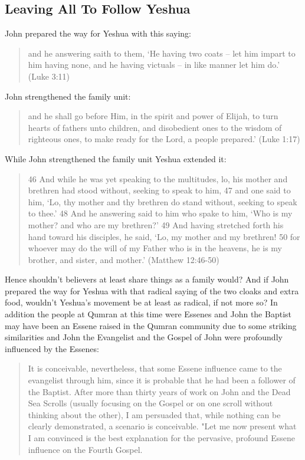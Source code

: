 \documentclass[11pt]{article}
\begin{document}
\subsection{Leaving All To Follow Yeshua} \label{leaving all to follow yeshua}
John prepared the way for Yeshua with this saying:
\begin{quote}
and he answering saith to them, `He having two coats -- let him impart to him having none, and he having victuals -- in like manner let him do.' (Luke 3:11) 
\end{quote}
John strengthened the family unit: 
\begin{quote}
and he shall go before Him, in the spirit and power of Elijah, to turn hearts of fathers unto children, and disobedient ones to the wisdom of righteous ones, to make ready for the Lord, a people prepared.' (Luke 1:17)
\end{quote}
While John strengthened the family unit Yeshua extended it: 
\begin{quote}
46 And while he was yet speaking to the multitudes, lo, his mother and brethren had stood without, seeking to speak to him, 47 and one said to him, `Lo, thy mother and thy brethren do stand without, seeking to speak to thee.' 48 And he answering said to him who spake to him, `Who is my mother? and who are my brethren?' 49 And having stretched forth his hand toward his disciples, he said, `Lo, my mother and my brethren! 50 for whoever may do the will of my Father who is in the heavens, he is my brother, and sister, and mother.' (Matthew 12:46-50)
\end{quote}
Hence shouldn't believers at least share things as a family would? And if John prepared the way for Yeshua with that radical saying of the two cloaks and extra food, wouldn't Yeshua's movement be at least as radical, if not more so? In addition the people at Qumran at this time were Essenes \cite{John the Baptist and the Qumran Connection} and John the Baptist may have been an Essene raised in the Qumran community due to some striking similarities \cite{John the Baptist and the Qumran Connection} and John the Evangelist and the Gospel of John were profoundly influenced by the Essenes: 
\begin{quote}
It is conceivable, nevertheless, that some Essene influence came to the evangelist through him, since it is probable that he had been a follower of the Baptist. After more than thirty years of work on John and the Dead Sea Scrolls (usually focusing on the Gospel or on one scroll without thinking about the other), I am persuaded that, while nothing can be clearly demonstrated, a scenario is conceivable. "Let me now present what I am convinced is the best explanation for the pervasive, profound Essene influence on the Fourth Gospel. \cite{Exploring the Gospel of John}
\end{quote}
\end{document}

